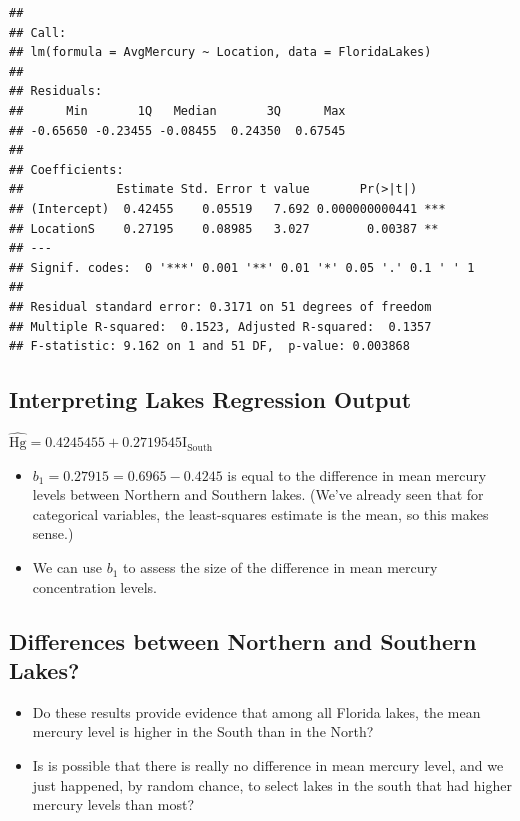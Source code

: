 \documentclass[]{book}
\begin{document}
\begin{verbatim}
## 
## Call:
## lm(formula = AvgMercury ~ Location, data = FloridaLakes)
## 
## Residuals:
##      Min       1Q   Median       3Q      Max 
## -0.65650 -0.23455 -0.08455  0.24350  0.67545 
## 
## Coefficients:
##             Estimate Std. Error t value       Pr(>|t|)    
## (Intercept)  0.42455    0.05519   7.692 0.000000000441 ***
## LocationS    0.27195    0.08985   3.027        0.00387 ** 
## ---
## Signif. codes:  0 '***' 0.001 '**' 0.01 '*' 0.05 '.' 0.1 ' ' 1
## 
## Residual standard error: 0.3171 on 51 degrees of freedom
## Multiple R-squared:  0.1523, Adjusted R-squared:  0.1357 
## F-statistic: 9.162 on 1 and 51 DF,  p-value: 0.003868
\end{verbatim}

\subsection{Interpreting Lakes Regression
Output}\label{interpreting-lakes-regression-output-1}

\(\widehat{\text{Hg}} = 0.4245455 +0.2719545\text{I}_{\text{South}}\)

\begin{itemize}
\item
  \(b_1 = 0.27915= 0.6965 - 0.4245\) is equal to the difference in mean
  mercury levels between Northern and Southern lakes. (We've already
  seen that for categorical variables, the least-squares estimate is the
  mean, so this makes sense.)
\item
  We can use \(b_1\) to assess the size of the difference in mean
  mercury concentration levels.
\end{itemize}

\subsection{Differences between Northern and Southern
Lakes?}\label{differences-between-northern-and-southern-lakes}

\begin{itemize}
\item
  Do these results provide evidence that among all Florida lakes, the
  mean mercury level is higher in the South than in the North?
\item
  Is is possible that there is really no difference in mean mercury
  level, and we just happened, by random chance, to select lakes in the
  south that had higher mercury levels than most?
\end{itemize}
\end{document}
